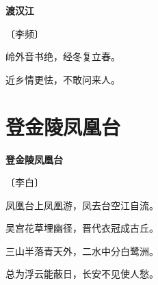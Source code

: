 \documentclass[12pt,UTF-8,openany,fontset=none]{ctexbook}
\begin{document}

\begin{center}
    {\bfseries 渡汉江}

    \vspace{18pt}

    \begin{large}\xuwen
        〔李频〕
    \end{large}

\end{center}

    \vspace{18pt}

\begin{center}
    \begin{Large}

        岭外音书绝，经冬复立春。

        近乡情更怯，不敢问来人。

    \end{Large}

\end{center}

\vspace{8pt}
\clearpage

\section{登金陵凤凰台}


\begin{center}
    {\bfseries 登金陵凤凰台}

    \vspace{18pt}

    \begin{large}\xuwen
        〔李白〕
    \end{large}

\end{center}

    \vspace{18pt}

\begin{center}
    \begin{Large}

        凤凰台上凤凰游，凤去台空江自流。

        吴宫花草埋幽径，晋代衣冠成古丘。

        三山半落青天外，二水中分白鹭洲。

        总为浮云能蔽日，长安不见使人愁。

    \end{Large}

\end{center}
\end{document}
